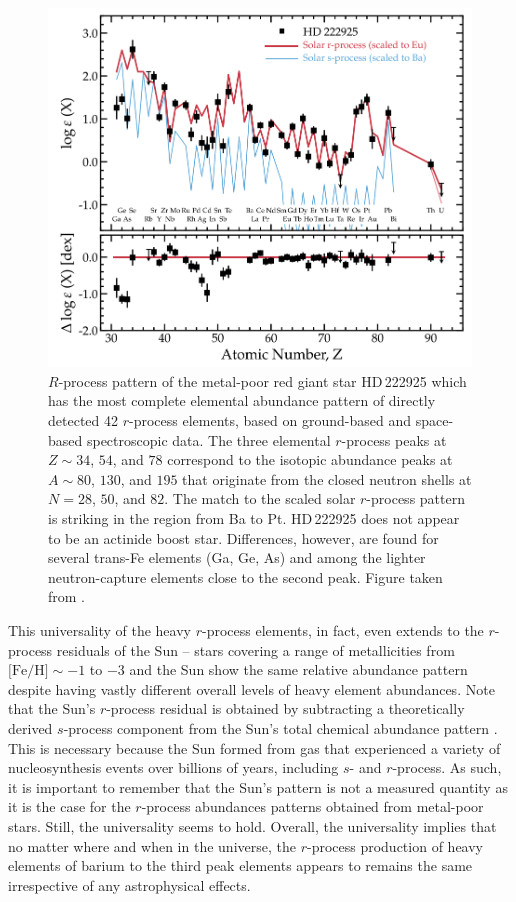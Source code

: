\documentclass[letterpaper]{article}
\begin{document}
\begin{figure}
\centering
    \includegraphics[width=0.7\linewidth]{figures/Roederer2022_Pattern.png}
    \caption{$R$-process pattern of the metal-poor red giant star HD\,222925 which has the most complete elemental abundance pattern of directly detected 42 $r$-process elements, based on ground-based and space-based spectroscopic data. The three elemental $r$-process peaks at $Z \sim 34$, $54$, and $78$ correspond to the isotopic abundance peaks at $A \sim 80$, $130$, and $195$ that originate from the closed neutron shells at $N=28$, $50$, and $82$. The match to the scaled solar $r$-process pattern is striking in the region from Ba to Pt. HD\,222925 does not appear to be an actinide boost star. Differences, however, are found for several trans-Fe elements (Ga, Ge, As) and among the lighter neutron-capture elements close to the second peak. 
    Figure taken from \citet{Roederer2022}.}
    \label{fig:rprocpattern}
\end{figure}


This universality of the heavy $r$-process elements, in fact, even extends to the $r$-process residuals of the Sun -- stars covering a range of metallicities from $\mbox{[Fe/H]}\sim-1$ to $-3$ and the Sun show the same relative abundance pattern despite having vastly different overall levels of heavy element abundances. Note that the Sun's $r$-process residual is obtained by subtracting a theoretically derived $s$-process component from the Sun's total chemical abundance pattern \citep[e.g.,][]{Goriely1999,Sneden2008,Bisterzo2014,Prantzos2020}. This is necessary because the Sun formed from gas that experienced a variety of nucleosynthesis events over billions of years, including $s$- and $r$-process. As such, it is important to remember that the Sun's pattern is not a measured quantity as it is the case for the $r$-process abundances patterns obtained from metal-poor stars. Still, the universality seems to hold. Overall, the universality implies that no matter where and when in the universe, the $r$-process production of heavy elements of barium to the third peak elements  appears to remains the same irrespective of any astrophysical effects. 
\end{document}
